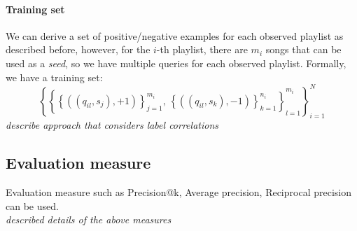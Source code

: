 \documentclass[9pt]{extarticle}
\newcommand{\1}{\mathbf{1}}
\begin{document}
{\paragraph{Training set}
We can derive a set of positive/negative examples for each observed playlist as described before, however,
for the $i$-th playlist, there are $m_i$ songs that can be used as a \emph{seed}, so we have multiple queries for each observed playlist.
Formally, we have a training set:
\begin{equation*}
\left\{ \left\{ 
        \left\{\left((q_{il}, s_j), +1\right) \right\}_{j=1}^{m_i}, \,
        \left\{\left((q_{il}, s_k), -1\right) \right\}_{k=1}^{n_i}  \right\}_{l=1}^{m_i} \right\}_{i=1}^N
\end{equation*}
\emph{describe approach that considers label correlations}

}


\subsection{Evaluation measure}
Evaluation measure such as Precision@k, Average precision, Reciprocal precision can be used.
\\ \emph{described details of the above measures}

%
%


\end{document}
